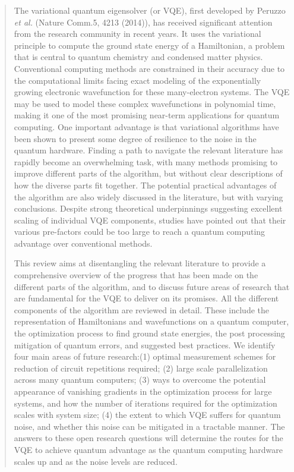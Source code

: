 \documentclass[a4paper,fleqn]{cas-sc}
\begin{document}
\begin{abstract}
The variational quantum eigensolver (or VQE), first developed by Peruzzo \textit{et al.} (Nature Comm.5, 4213 (2014)), has received significant attention from the research community in recent years. It uses the variational principle to compute the ground state energy of a Hamiltonian, a problem that is central to quantum chemistry and condensed matter physics. Conventional computing methods are constrained in their accuracy due to the computational limits facing exact modeling of the exponentially growing electronic wavefunction for these many-electron systems. The VQE may be used to model these complex wavefunctions in polynomial time, making it one of the most promising near-term applications for quantum computing. One important advantage is that variational algorithms have been shown to present some degree of resilience to the noise in the quantum hardware. Finding a path to navigate the relevant literature has rapidly become an overwhelming task, with many methods promising to improve different parts of the algorithm, but without clear descriptions of how the diverse parts fit together. The potential practical advantages of the algorithm are also widely discussed in the literature, but with varying conclusions. Despite strong theoretical underpinnings suggesting excellent scaling of individual VQE components, studies have pointed out that their various pre-factors could be too large to reach a quantum computing advantage over conventional methods.

This review aims at disentangling the relevant literature to provide a comprehensive overview of the progress that has been made on the different parts of the algorithm, and to discuss future areas of research that are fundamental for the VQE to deliver on its promises. All the different components of the algorithm are reviewed in detail. These include the representation of Hamiltonians and wavefunctions on a quantum computer, the optimization process to find ground state energies, the post processing mitigation of quantum errors, and suggested best practices. We identify four main areas of future research:(1) optimal measurement schemes for reduction of circuit repetitions required; (2) large scale parallelization across many quantum computers;  (3) ways to overcome the potential appearance of vanishing gradients in the optimization process for large systems, and how the number of iterations required for the optimization scales with system size; (4) the extent to which VQE suffers for quantum noise, and whether this noise can be mitigated in a tractable manner. The answers to these open research questions will determine the routes for the VQE to achieve quantum advantage as the quantum computing hardware scales up and as the noise levels are reduced.
\end{abstract}
\end{document}

